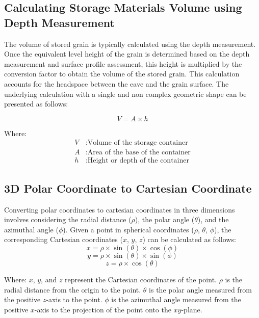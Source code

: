 \subsection{Calculating Storage Materials Volume using Depth Measurement}
The volume of stored grain is typically calculated using the depth measurement. Once the equivalent level height of the grain is determined based on the depth measurement and surface profile assessment, this height is multiplied by the conversion factor to obtain the volume of the stored grain. This calculation accounts for the headspace between the eave and the grain surface. The underlying calculation with a single and non complex geometric shape can be presented as follows:

\begin{equation}
	V = A \times h
\end{equation}

Where:
\begin{align*}
	V & : \text{Volume of the storage container}   \\
	A & : \text{Area of the base of the container} \\
	h & : \text{Height or depth of the container}
\end{align*}

\subsection{3D Polar Coordinate to Cartesian Coordinate}
Converting polar coordinates to cartesian coordinates in three dimensions involves considering the radial distance ($\rho$), the polar angle ($\theta$), and the azimuthal angle ($\phi$). Given a point in spherical coordinates ($\rho$, $\theta$, $\phi$), the corresponding Cartesian coordinates ($x$, $y$, $z$) can be calculated as follows:
\begin{equation}
	x = \rho \times \sin(\theta) \times \cos(\phi)
\end{equation}
\begin{equation}
	y = \rho \times \sin(\theta) \times \sin(\phi)
\end{equation}
\begin{equation}
	z = \rho \times \cos(\theta)
\end{equation}

Where:
$x$, $y$, and $z$ represent the Cartesian coordinates of the point.
$\rho$ is the radial distance from the origin to the point.
$\theta$ is the polar angle measured from the positive $z$-axis to the point.
$\phi$ is the azimuthal angle measured from the positive $x$-axis to the projection of the point onto the $xy$-plane.

